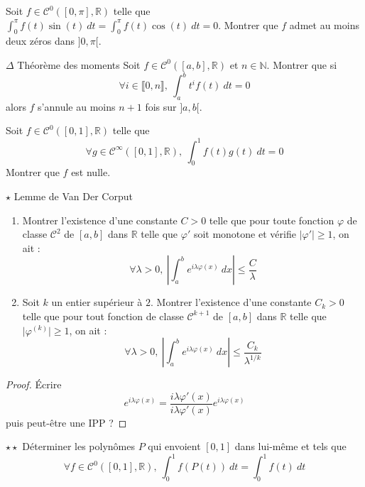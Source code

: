 \documentclass[french,a4paper]{article}
\newcommand{\N}{\mathbb{N}}
\newcommand{\R}{\mathbb{R}}
\theoremstyle{plain}
\theoremstyle{definition}
\theoremstyle{remark}
\begin{document}
\begin{ex}[Moulin.IG.12]{}
	Soit $f\in\mathcal{C}^0([0,\pi],\R)$ telle que $\displaystyle\int_{0}^{\pi}f(t)\sin(t)\ dt=\int_{0}^{\pi}f(t)\cos(t)\ dt=0$. Montrer que $f$ admet au moins deux zéros dans $]0,\pi[$.
\end{ex}

\begin{ex}[Moulin.IG.13]{$\Delta$ Théorème des moments}
	Soit $f\in\mathcal{C}^0([a,b],\R)$ et $n\in\N$. Montrer que si $$\forall i\in\llbracket0,n\rrbracket,\ \int_{a}^{b}t^if(t)\ dt=0$$ alors $f$ s'annule au moins $n+1$ fois sur $]a,b[$.
\end{ex}

\begin{ex}[Moulin.IG.14]{}
	Soit $f\in\mathcal{C}^0([0,1],\R)$ telle que $$\forall g\in\mathcal{C}^\infty([0,1],\R),\ \int_{0}^{1}f(t)g(t)\ dt=0$$ Montrer que $f$ est nulle.
\end{ex}

\begin{ex}[Châteaux]{$\star$ Lemme de Van Der Corput}
	\begin{enumerate}
		\item Montrer l'existence d'une constante $C>0$ telle que pour toute fonction $\varphi$ de classe $\mathcal{C}^2$ de $[a,b]$ dans $\R$ telle que $\varphi'$ soit monotone et vérifie $\lvert\varphi'\rvert\geqslant1$, on ait : $$\forall\lambda>0,\ \left\lvert\int_{a}^{b}e^{i\lambda\varphi(x)}\ dx\right\rvert\leqslant\frac{C}{\lambda}$$
		\item Soit $k$ un entier supérieur à $2$. Montrer l'existence d'une constante $C_k>0$ telle que pour tout fonction de classe $\mathcal{C}^{k+1}$ de $[a,b]$ dans $\R$ telle que $\lvert\varphi^{(k)}\rvert\geqslant 1$, on ait : $$\forall\lambda>0,\ \left\lvert\int_{a}^{b}e^{i\lambda\varphi(x)}\ dx\right\rvert\leqslant\frac{C_k}{\lambda^{1/k}}$$
	\end{enumerate}
\end{ex}
\begin{proof}
	Écrire $$e^{i\lambda\varphi(x)}=\frac{i\lambda\varphi'(x)}{i\lambda\varphi'(x)}e^{i\lambda\varphi(x)}$$ puis peut-être une IPP ?
\end{proof}

\begin{ex}[Moulin.IG.15]{$\star\star$}
	Déterminer les polynômes $P$ qui envoient $[0,1]$ dans lui-même et tels que $$\forall f\in\mathcal{C}^0([0,1],\R),\ \int_{0}^{1}f(P(t))\ dt=\int_{0}^{1}f(t)\ dt$$
\end{ex}
\end{document}
